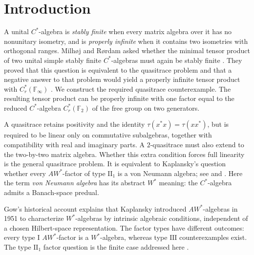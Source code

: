 \begin{abstract}
We refute Kaplansky's quasitrace conjecture by constructing a separable
unital complex \(C^*\)-algebra that admits normalized \(2\)-quasitraces
but has no tracial state. As a consequence, we show that the minimal tensor
product of two unital simple stably finite complex \(C^*\)-algebras can be
properly infinite, even when one factor is the reduced free-group algebra
\(C_r^*(\mathbb F_2)\).
\end{abstract}

\section{Introduction}
\label{sec:introduction}

A unital \(C^*\)-algebra is \emph{stably finite} when every matrix
algebra over it has no nonunitary isometry, and is \emph{properly
infinite} when it contains two isometries with orthogonal ranges.
Milh{\o}j and R{\o}rdam asked whether the minimal tensor product of two
unital simple stably finite \(C^*\)-algebras must again be stably finite
\cite[Question~2.5]{MR}. They proved that this question is equivalent
to the quasitrace problem and that a negative answer to that problem would yield a
properly infinite tensor product with \(C_r^*(\mathbb F_\infty)\)
\cite[Section~2 and Theorem~3.1]{MR}. We construct the required
quasitrace counterexample. The resulting tensor product can be properly
infinite with one factor equal to the reduced \(C^*\)-algebra
\(C_r^*(\mathbb F_2)\) of the free group on two generators.

A quasitrace retains positivity and the identity
\(\tau(x^*x)=\tau(xx^*)\), but is required to be linear only on
commutative subalgebras, together with compatibility with real and
imaginary parts. A \(2\)-quasitrace must also extend to the two-by-two
matrix algebra. Whether this extra condition forces full linearity
is the general quasitrace problem. It is equivalent to Kaplansky's
question whether every \(AW^*\)-factor of type \(\mathrm{II}_1\) is a
von Neumann algebra; see \cite[Section~2]{MR} and
\cite[Conjectures~1.1--1.2 and Theorem~4.11]{Gow}.
Here the term \emph{von Neumann algebra} has its abstract \(W^*\)
meaning: the \(C^*\)-algebra admits a Banach-space predual.

Gow's historical account explains that Kaplansky introduced
\(AW^*\)-algebras in 1951 to characterize \(W^*\)-algebras by intrinsic
algebraic conditions, independent of a chosen Hilbert-space
representation. The factor types have different outcomes: every type
\(\mathrm{I}\) \(AW^*\)-factor is a \(W^*\)-algebra, whereas type
\(\mathrm{III}\) counterexamples exist. The type \(\mathrm{II}_1\)
factor question is the finite case addressed here
\cite[Introduction]{Gow}.

